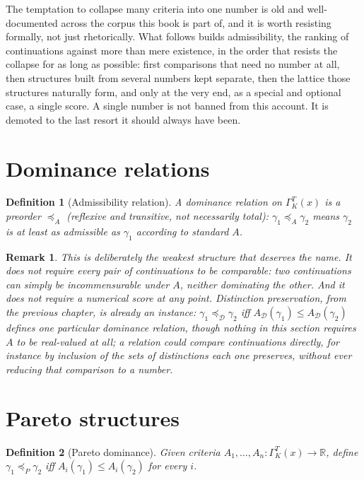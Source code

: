 \documentclass[11pt]{report}
\newtheorem{definition}{Definition}[chapter]
\newtheorem{remark}{Remark}[chapter]
\begin{document}
The temptation to collapse many criteria into one number is old and
well-documented across the corpus this book is part of, and it is worth
resisting formally, not just rhetorically. What follows builds
admissibility, the ranking of continuations against more than mere
existence, in the order that resists the collapse for as long as
possible: first comparisons that need no number at all, then structures
built from several numbers kept separate, then the lattice those
structures naturally form, and only at the very end, as a special and
optional case, a single score. A single number is not banned from this
account. It is demoted to the last resort it should always have been.

\section*{Dominance relations}

\begin{definition}[Admissibility relation]
A dominance relation on $\Gamma_K^T(x)$ is a preorder $\preceq_A$
(reflexive and transitive, not necessarily total): $\gamma_1 \preceq_A
\gamma_2$ means $\gamma_2$ is at least as admissible as $\gamma_1$
according to standard $A$.
\end{definition}

\begin{remark}
This is deliberately the weakest structure that deserves the name.
It does not require every pair of continuations to be comparable:
two continuations can simply be incommensurable under $A$, neither
dominating the other. And it does not require a numerical score at
any point. Distinction preservation, from the previous chapter, is
already an instance: $\gamma_1 \preceq_{\mathcal D} \gamma_2$ iff
$A_{\mathcal D}(\gamma_1) \leq A_{\mathcal D}(\gamma_2)$ defines one
particular dominance relation, though nothing in this section requires
$A$ to be real-valued at all; a relation could compare continuations
directly, for instance by inclusion of the sets of distinctions each
one preserves, without ever reducing that comparison to a number.
\end{remark}

\section*{Pareto structures}

\begin{definition}[Pareto dominance]
Given criteria $A_1, \dots, A_n : \Gamma_K^T(x) \to \mathbb{R}$, define
$\gamma_1 \preceq_P \gamma_2$ iff $A_i(\gamma_1) \leq A_i(\gamma_2)$ for
every $i$.
\end{definition}
\end{document}
